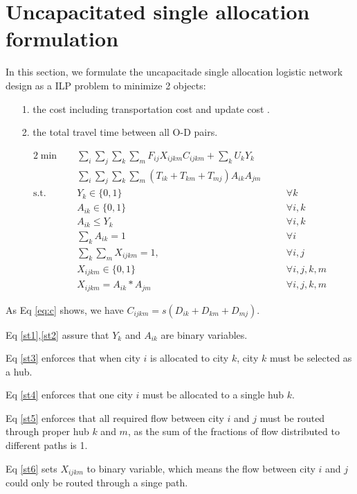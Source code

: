 \documentclass{llncs}
\begin{document}
\section{Uncapacitated single allocation formulation}
	In this section, we formulate the uncapacitade single allocation logistic network design as a ILP problem to minimize 2 objects:
	\begin{itemize}
		\item[1.] the cost including transportation cost and update cost .
		\item[2.] the total travel time between all O-D pairs.
	\end{itemize}
	
	
	\begin{alignat}{2}
	\min\quad
	& \sum_{i}\sum_{j}\sum_{k}\sum_{m}F_{ij}  X_{ijkm} C_{ijkm} + \sum_{k}U_k Y_{k} \nonumber & &\\
	\quad& \sum_{i}\sum_{j}\sum_{k}\sum_{m}{(T_{ik}+ T_{km}+ T_{mj} ) A_{ik} A_{jm}}  & & \tag{LP1}\\
	\mbox{s.t.}  \quad
	&Y_{k} \in \{0,1\} &\quad& \forall k \label{st1}\\ 
	&A_{ik} \in \{0,1\} &\quad& \forall i,k \label{st2}\\ 
	&A_{ik} \leq Y_{k} &\quad& \forall i,k \label{st3}\\
	&\sum_{k}{A_{ik}} = 1 &\quad& \forall i \label{st4}\\
	&\sum_{k}\sum_{m}{X_{ijkm} = 1}, &\quad& \forall i,j \label{st5}\\
	&X_{ijkm} \in \{0,1\} &\quad& \forall i,j,k,m \label{st6}\\
	&X_{ijkm} = A_{ik} * A_{jm} &\quad& \forall i,j,k,m \label{st7}
	\end{alignat}
	
	As Eq \ref{eq:c} shows, we have $ C_{ijkm} = s(D_{ik}+D_{km}+D_{mj})$.
	
	Eq \ref{st1},\ref{st2} assure that $Y_k$ and $A_{ik}$ are binary variables.
	
	Eq \ref{st3} enforces that when city $i$ is allocated to city $k$, city $k$ must be selected as a hub.
	
	Eq \ref{st4} enforces that one city $i$ must be allocated to a single hub $k$.
	
	Eq \ref{st5} enforces that all required flow between city $i$ and $j$ must be routed through proper hub $k$ and $m$, as the sum of the fractions of flow distributed to different paths is 1.
	
	Eq \ref{st6} sets $X_{ijkm}$ to binary variable, which means the flow between city $i$ and $j$ could only be routed through a singe path.
	
\end{document}
